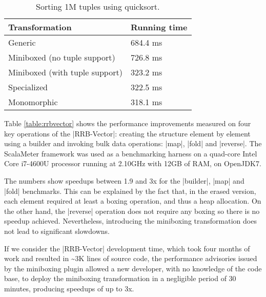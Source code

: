 \begin{table}[t]
  \begin{tabularx}{0.48\textwidth}{|g *{1}{|Y}|} \hline
    \textbf{Transformation} & \textbf{Running time}  \\ \hline
    Generic                        &              684.4 ms  \\
    Miniboxed (no tuple support)   &              726.8 ms  \\
    Miniboxed (with tuple support) &              323.2 ms  \\
    Specialized                    &              322.5 ms  \\
    Monomorphic                    &              318.1 ms  \\ \hline
  \end{tabularx}
  \vspace{-2mm}
  \caption{Sorting 1M tuples using quicksort.}
  \label{table:tuple}
  \vspace{-2.0em}
\end{table}


Table \ref{table:rrbvector} shows the performance improvements measured on four key operations of the |RRB-Vector|: creating the structure element by element using a builder and invoking bulk data operations: |map|, |fold| and |reverse|. The ScalaMeter framework \cite{scalameter} was used as a benchmarking harness on a quad-core Intel Core i7-4600U processor running at 2.10GHz with 12GB of RAM, on OpenJDK7. %

The numbers show speedups between 1.9 and 3x for the |builder|, |map| and |fold| benchmarks. This can be explained by the fact that, in the erased version, each element required at least a boxing operation, and thus a heap allocation. On the other hand, the |reverse| operation does not require any boxing so there is no speedup achieved. Nevertheless, introducing the miniboxing transformation does not lead to significant slowdowns.

If we consider the |RRB-Vector| development time, which took four months of work and resulted in \textasciitilde3K lines of source code, the performance advisories issued by the miniboxing plugin allowed a new developer, with no knowledge of the code base, to deploy the miniboxing transformation in a negligible period of 30 minutes, producing speedups of up to 3x.

\vspace{-0.45em}

